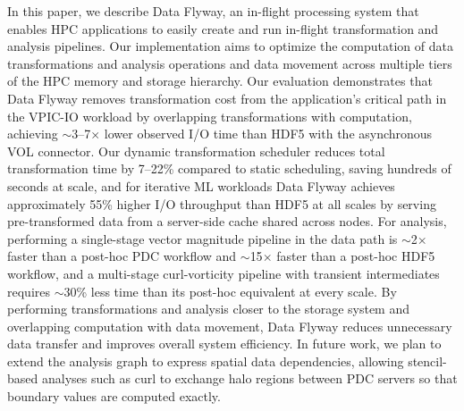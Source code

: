 In this paper, we describe Data Flyway, an in-flight processing system that enables HPC applications to easily create and run in-flight transformation and analysis pipelines. Our implementation aims to optimize the computation of data transformations and analysis operations and data movement across multiple tiers of the HPC memory and storage hierarchy. Our evaluation demonstrates that Data Flyway removes transformation cost from the application's critical path in the VPIC-IO workload by overlapping transformations with computation, achieving $\sim$3--7$\times$ lower observed I/O time than HDF5 with the asynchronous VOL connector. Our dynamic transformation scheduler reduces total transformation time by 7--22\% compared to static scheduling, saving hundreds of seconds at scale, and for iterative ML workloads Data Flyway achieves approximately 55\% higher I/O throughput than HDF5 at all scales by serving pre-transformed data from a server-side cache shared across nodes. For analysis, performing a single-stage vector magnitude pipeline in the data path is $\sim$2$\times$ faster than a post-hoc PDC workflow and $\sim$15$\times$ faster than a post-hoc HDF5 workflow, and a multi-stage curl-vorticity pipeline with transient intermediates requires $\sim$30\% less time than its post-hoc equivalent at every scale. By performing transformations and analysis closer to the storage system and overlapping computation with data movement, Data Flyway reduces unnecessary data transfer and improves overall system efficiency. In future work, we plan to extend the analysis graph to express spatial data dependencies, allowing stencil-based analyses such as curl to exchange halo regions between PDC servers so that boundary values are computed exactly.

\newpage